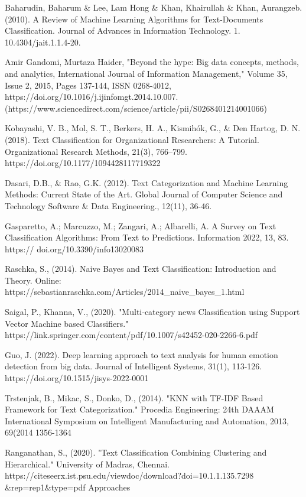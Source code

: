 \documentclass[a4paper]{article}
\begin{document}
\eightpt

\begin{thebibliography}{10}

 Baharudin, Baharum \& Lee, Lam Hong \& Khan, Khairullah \& Khan, Aurangzeb. (2010). A Review of Machine Learning Algorithms for Text-Documents Classification. Journal of Advances in Information Technology. 1. 10.4304/jait.1.1.4-20. 

 Amir Gandomi, Murtaza Haider, "Beyond the hype: Big data concepts, methods, and analytics, International Journal of Information Management,"
Volume 35, Issue 2, 2015, Pages 137-144, ISSN 0268-4012, 
https://doi.org/10.1016/j.ijinfomgt.2014.10.007. (https://www.sciencedirect.com/science/article/pii/S0268401214001066)

   Kobayashi, V. B., Mol, S. T., Berkers, H. A., Kismihók, G., \& Den Hartog, D. N. (2018). Text Classification for Organizational Researchers: A Tutorial. Organizational Research Methods, 21(3), 766–799. https://doi.org/10.1177/1094428117719322

 Dasari, D.B., \&  Rao, G.K. (2012). Text Categorization and Machine Learning Methods: Current State of the Art. Global Journal of Computer Science and Technology Software \& Data Engineering., 12(11), 36-46.

 Gasparetto, A.; Marcuzzo, M.; Zangari, A.; Albarelli, A. A Survey on Text Classification Algorithms: From Text to Predictions. Information 2022, 13, 83. https://
doi.org/10.3390/info13020083

 Raschka, S., (2014). Naive Bayes and Text Classification: Introduction and Theory.  Online: https://sebastianraschka.com/Articles/2014\_naive\_bayes\_1.html

 Saigal, P., Khanna, V., (2020). "Multi‑category news Classification using Support Vector Machine based Classifiers." https://link.springer.com/content/pdf/10.1007/s42452-020-2266-6.pdf

 Guo, J. (2022). Deep learning approach to text analysis for human emotion detection from big data. Journal of Intelligent Systems, 31(1), 113-126. https://doi.org/10.1515/jisys-2022-0001

 Trstenjak, B., Mikac, S., Donko, D., (2014). "KNN with TF-IDF Based Framework for Text Categorization."  Procedia Engineering: 24th DAAAM International Symposium on Intelligent Manufacturing and Automation, 2013, 69(2014 1356-1364

 Ranganathan, S., (2020). "Text Classification Combining Clustering and Hierarchical." University of Madras, Chennai. https://citeseerx.ist.psu.edu/viewdoc/download?doi=10.1.1.135.7298 \&rep=rep1\&type=pdf Approaches 
\end{thebibliography}
\end{document}
